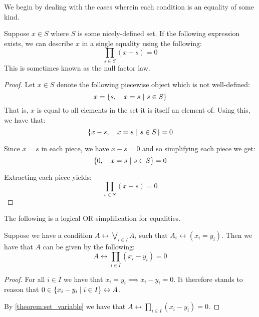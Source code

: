 We begin by dealing with the cases wherein each condition is an equality of some kind.
\begin{theorem}
    Suppose $x\in S$ where $S$ is some nicely-defined set. If the following expression exists, we can describe $x$ in a single equality using the following:
    $$
        \prod_{s\in S}{(x-s)}=0
    $$
    This is sometimes known as the null factor law.

    \begin{proof}
        \label{theorem:set_variable}
        Let $x\in S$ denote the following piecewise object which is not well-defined:
        $$
            x = \pwobj{s}{x=s}{s\in S}
        $$
        That is, $x$ is equal to all elements in the set it is itself an element of. Using this, we have that:
        $$
            \pwobj{x-s}{x=s}{s\in S}=0
        $$

        Since $x=s$ in each piece, we have $x-s=0$ and so simplifying each piece we get:
        $$
            \pwobj{0}{x=s}{s\in S}=0
        $$

        Extracting each piece yields:
        $$
            \prod_{s\in S}{(x-s)}=0
        $$
    \end{proof}
\end{theorem}
\begin{theorem}
    \label{theorem:logical_or_equality}
    The following is a logical OR simplification for equalities.

    Suppose we have a condition $A\leftrightarrow \displaystyle\bigvee_{i\in I}{A_i}$ such that $A_i\leftrightarrow(x_i=y_i)$. Then we have that $A$ can be given by the following:
    $$
        A\leftrightarrow\prod_{i\in I}{(x_i-y_i)}=0
    $$

    \begin{proof}
        For all $i\in I$ we have that $x_i=y_i\implies x_i-y_i=0$. It therefore stands to reason that $0\in\br*{x_i-y_i\mid i\in I}\leftrightarrow A$.

        By \ref{theorem:set_variable} we have that $A\leftrightarrow \prod_{i\in I}{(x_i-y_i)}=0$.
    \end{proof}
\end{theorem}
